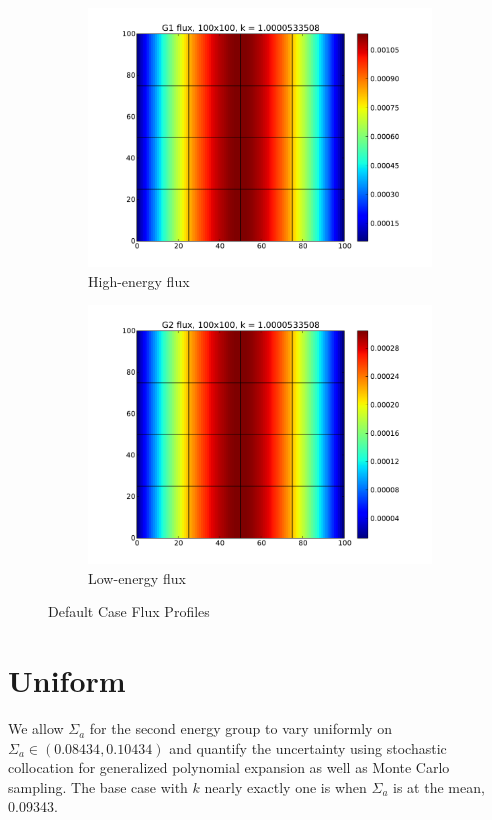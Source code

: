 \documentclass[11pt]{article} %
\begin{document}
\begin{figure}[h!]
\centering
  \begin{subfigure}[b]{0.45 \textwidth}
   \includegraphics[width=\textwidth]{g1_50_flux}
   \caption{High-energy flux}
  \end{subfigure}
  \begin{subfigure}[b]{0.45\textwidth}
   \includegraphics[width=\textwidth]{g2_50_flux}
   \caption{Low-energy flux}
  \end{subfigure}
\caption{Default Case Flux Profiles}
\label{fluxes}
\end{figure}


\section{Uniform}
We allow $\Sigma_a$ for the second energy group to vary uniformly on $\Sigma_a\in(0.08434,0.10434)$ and quantify the uncertainty using stochastic collocation for generalized polynomial expansion as well as Monte Carlo sampling.  The base case with $k$ nearly exactly one is when $\Sigma_a$ is at the mean, 0.09343.
\end{document}
